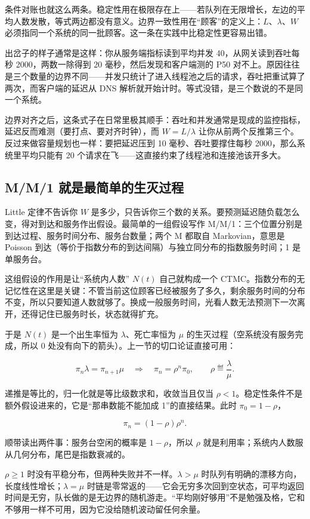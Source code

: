 条件对账也就这么两条。稳定性用在极限存在上——若队列在无限增长，左边的平均人数发散，等式两边都没有意义。边界一致性用在``顾客''的定义上：\(L\)、\(\lambda\)、\(W\) 必须指同一个系统的同一批顾客。这一条在实践中比稳定性更容易出错。

出岔子的样子通常是这样：你从服务端指标读到平均并发 40，从网关读到吞吐每秒 2000，两数一除得到 20 毫秒，然后发现和客户端测的 P50 对不上。原因往往是三个数量的边界不同——并发只统计了进入线程池之后的请求，吞吐把重试算了两次，而客户端的延迟从 DNS 解析就开始计时。等式没错，是三个数说的不是同一个系统。

边界对齐之后，这条式子在日常里极其顺手：吞吐和并发通常是现成的监控指标，延迟反而难测（要打点、要对齐时钟），而 \(W=L/\lambda\) 让你从前两个反推第三个。反过来做容量规划也一样：要把延迟压到 10 毫秒、吞吐要撑住每秒 2000，那么系统里平均只能有 20 个请求在飞——这直接约束了线程池和连接池该开多大。

\subsection{M/M/1 就是最简单的生灭过程}

Little 定律不告诉你 \(W\) 是多少，只告诉你三个数的关系。要预测延迟随负载怎么变，得对到达和服务作出假设。最简单的一组假设写作 M/M/1：三个位置分别是到达过程、服务时间分布、服务台数量；两个 M 都取自 Markovian，意思是 Poisson 到达（等价于指数分布的到达间隔）与独立同分布的指数服务时间；1 是单服务台。

这组假设的作用是让``系统内人数'' \(N(t)\) 自己就构成一个 CTMC。指数分布的无记忆性在这里是关键：不管当前这位顾客已经被服务了多久，剩余服务时间的分布不变，所以只要知道人数就够了。换成一般服务时间，光看人数无法预测下一次离开，还得记住已服务时长，状态就得扩充。

于是 \(N(t)\) 是一个出生率恒为 \(\lambda\)、死亡率恒为 \(\mu\) 的生灭过程（空系统没有服务完成，所以 0 处没有向下的箭头）。上一节的切口论证直接可用：

\[
\pi_n\lambda=\pi_{n+1}\mu
\quad\Longrightarrow\quad
\pi_n=\rho^n\pi_0,
\qquad \rho\eqdef\frac{\lambda}{\mu}.
\]

递推是等比的，归一化就是等比级数求和，收敛当且仅当 \(\rho<1\)。稳定性条件不是额外假设进来的，它是``那串数能不能加成 1''的直接结果。此时 \(\pi_0=1-\rho\)，

\[
\pi_n=(1-\rho)\rho^n.
\]

顺带读出两件事：服务台空闲的概率是 \(1-\rho\)，所以 \(\rho\) 就是利用率；系统内人数服从几何分布，尾巴是指数衰减的。

\(\rho\ge 1\) 时没有平稳分布，但两种失败并不一样。\(\lambda>\mu\) 时队列有明确的漂移方向，长度线性增长；\(\lambda=\mu\) 时链是零常返的——它会无穷多次回到空状态，可平均返回时间是无穷，队长做的是无边界的随机游走。``平均刚好够用''不是勉强及格，它和不够用一样不可用，因为它没给随机波动留任何余量。

